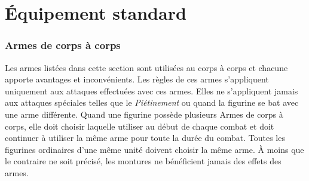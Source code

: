 
\part{Équipement standard}

\section{Armes de corps à corps}
\label{equipement/cac}

Les armes listées dans cette section sont utilisées au corps à corps et chacune apporte avantages et inconvénients. Les règles de ces armes s'appliquent uniquement aux attaques effectuées avec ces armes. Elles ne s'appliquent jamais aux attaques spéciales telles que le \emph{Piétinement} ou quand la figurine se bat avec une arme différente. Quand une figurine possède plusieurs Armes de corps à corps, elle doit choisir laquelle utiliser au début de chaque combat et doit continuer à utiliser la même arme pour toute la durée du combat. Toutes les figurines ordinaires d'une même unité doivent choisir la même arme. À moins que le contraire ne soit précisé, les montures ne bénéficient jamais des effets des armes.

